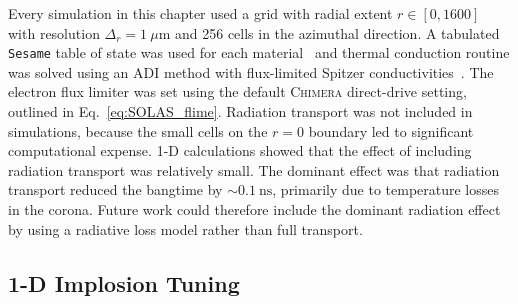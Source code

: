 Every simulation in this chapter used a grid with radial extent $r\in[0,1600]$ with resolution $\Delta_r=1\ \mu\text{m}$ and 256 cells in the azimuthal direction.
A tabulated \texttt{Sesame} table of state was used for each material~\cite{mchardy_introduction_2018} and thermal conduction routine was solved using an \ac{ADI} method with flux-limited Spitzer conductivities~\cite{peaceman_numerical_1955}.
The electron flux limiter was set using the default \textsc{Chimera} direct-drive setting, outlined in Eq.~\ref{eq:SOLAS_flime}.
Radiation transport was not included in simulations, because the small cells on the $r=0$ boundary led to significant computational expense.
1-D calculations showed that the effect of including radiation transport was relatively small.
The dominant effect was that radiation transport reduced the bangtime by $\sim 0.1\ \text{ns}$, primarily due to temperature losses in the corona.
Future work could therefore include the dominant radiation effect by using a radiative loss model rather than full transport.

\subsection{1-D Implosion Tuning}%
\label{sec:Res1_1D_tuning}

